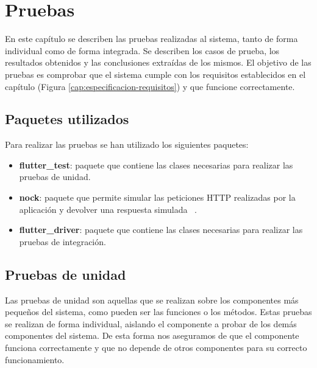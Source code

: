 \chapter{Pruebas}
\label{cap:pruebas}
En este capítulo se describen las pruebas realizadas al sistema, tanto de forma individual como de forma integrada. Se describen los casos de prueba, los resultados obtenidos y las conclusiones extraídas de los mismos.
El objetivo de las pruebas es comprobar que el sistema cumple con los requisitos establecidos en el capítulo (Figura \ref{cap:especificacion-requisitos}) y que funcione correctamente.

\section{Paquetes utilizados}
\label{sec:paquetes-utilizados}
Para realizar las pruebas se han utilizado los siguientes paquetes:

\begin{itemize}
    \item \textbf{flutter\_test}: paquete que contiene las clases necesarias para realizar las pruebas de unidad.
    \item \textbf{nock}: paquete que permite simular las peticiones HTTP realizadas por la aplicación y devolver una respuesta simulada ~\cite{nockpackage}. 
    \item \textbf{flutter\_driver}: paquete que contiene las clases necesarias para realizar las pruebas de integración. 
\end{itemize}


\section{Pruebas de unidad}
\label{sec:pruebas-unidad}
Las pruebas de unidad son aquellas que se realizan sobre los componentes más pequeños del sistema, como pueden ser las funciones o los métodos. Estas pruebas se realizan de forma individual, aislando el componente a probar de los demás componentes del sistema. 
De esta forma nos aseguramos de que el componente funciona correctamente y que no depende de otros componentes para su correcto funcionamiento.
\newpage




